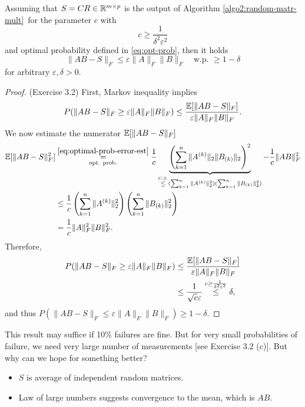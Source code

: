 \begin{remark*}
Assuming that $S=CR \in \mathbb{R}^{m\times p}$ is the output of Algorithm \ref{algo2:random-matr-mult}\ for the parameter $c$ with $$c\geq \frac{1}{\delta^2\varepsilon^2}$$ and optimal probability defined in \eqref{eq:opt-prob}, then it holds 
\begin{equation} \label{eq:error-bound-epsilon-f}
\|AB-S\|_F \leq \varepsilon \|A\|_F \|B\|_F\quad \text{w.p. } \geq 1 - \delta
\end{equation}
for arbitrary $\varepsilon,\delta>0$.
\begin{small} 
\begin{proof}(Exercise 3.2) First, Markov inequality implies
$$
P(\|AB-S\|_F \geq \varepsilon \|A\|_F \|B\|_F) \leq \frac{\mathbb{E} [\|AB-S\|_F]}{\varepsilon \|A\|_F\|B\|_F}.
$$
We now estimate the numerator $\mathbb{E} [\|AB-S\|_F]$
\begin{equation*}
\begin{split}
\mathbb{E}[\|AB-S\|_F^2] & \underset{\text{opt. prob.}}{\overset{\eqref{eq:optimal-prob-error-est}}{=}} \frac{1}{c} \underbrace{\left( \sum_{k=1}^n \|A^{(k)}\|_2 \|B_{(k)}\|_2\right)^2}_{\overset{\text{C.S.}}{\leq}
(\sum_{k=1}^n \|A^{(k)}\|_2^2)(\sum_{k=1}^n \|B_{(k)}\|_2^2)
}- \frac{1}{c} \|AB\|_F^2 \\
& \leq \frac{1}{c} \left(\sum_{k=1}^n \|A^{(k)}\|_2^2\right)\left(\sum_{k=1}^n \|B_{(k)}\|_2^2\right)  \\
& = \frac{1}{c}\|A\|_F^2 \|B\|_F^2.
\end{split}
\end{equation*}
Therefore,
\begin{equation*}
\begin{split}
P(\|AB-S\|_F \geq \varepsilon \|A\|_F \|B\|_F) &\leq \frac{\mathbb{E} [\|AB-S\|_F]}{\varepsilon \|A\|_F\|B\|_F} \\
&\leq \frac{1}{\sqrt{c}\varepsilon} \overset{c \geq \frac{1}{\delta^2\varepsilon^2}}{\leq} \delta,
\end{split}
\end{equation*}
and  thus $P(\|AB-S\|_F \leq \varepsilon \|A\|_F \|B\|_F) \geq 1-\delta$.
\end{proof}
\end{small}
\end{remark*}
This result may suffice if 10\% failures are fine. But for very small probabilities of failure, we need very large number of measurements [see Exercise 3.2 (c)].
But why can we hope for something better?%
\begin{itemize}[itemsep=0pt]
	\item $S$ is average of independent random matrices.
	\item Law of large numbers suggests convergence to the mean, which is $AB$. 
\end{itemize} \newpage
